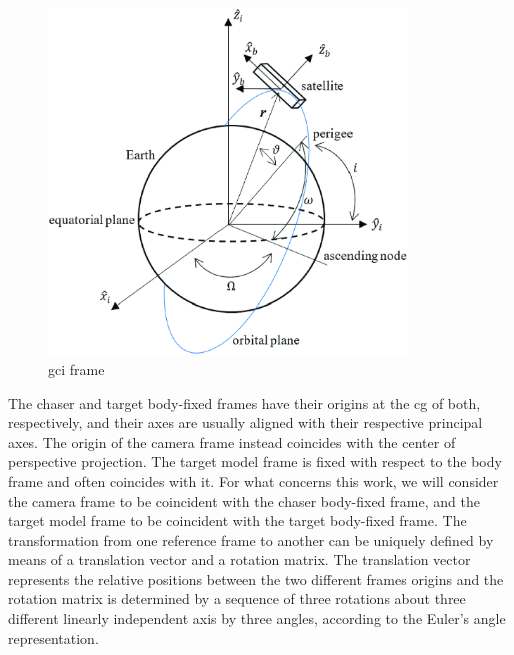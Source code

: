 \begin{figure}[htbp]
  \centering
  \includegraphics[width=0.85\textwidth]{gfx/gci.eps}
  \caption{\acrfull{gci} frame}
  \label{fig:raytracing}
\end{figure}

The chaser and target body-fixed frames have their origins at the \acrshort{cg} of both, respectively, and their axes are usually aligned with their respective principal axes. The origin of the camera frame instead coincides with the center of perspective projection. The target model frame is fixed with respect to the body frame and often coincides with it. For what concerns this work, we will consider the camera frame to be coincident with the chaser body-fixed frame, and the target model frame to be coincident with the target body-fixed frame. The transformation from one reference frame to another can be uniquely defined by means of a translation vector and a rotation matrix. The translation vector represents the relative positions between the two different frames origins and the rotation matrix is determined by a sequence of three rotations about three different linearly independent axis by three angles, according to the Euler's angle representation.

